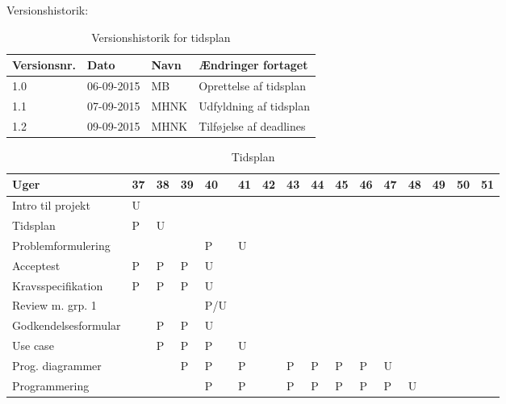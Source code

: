 \documentclass[landscape, 12pt, letterpaper]{article}
\begin{document}
\begin{table}[]
Versionshistorik:
\centering
\caption{Versionshistorik for tidsplan}
\label{my-label}
\begin{tabular}{|l|l|l|l|}
\hline
Versionsnr. & Dato       & Navn & Ændringer fortaget     \\ \hline
1.0         & 06-09-2015 & MB   & Oprettelse af tidsplan \\ \hline
1.1         & 07-09-2015 & MHNK & Udfyldning af tidsplan \\ \hline
1.2         & 09-09-2015 & MHNK & Tilføjelse af deadlines\\ \hline
\end{tabular}
\end{table}


\begin{table}[]
\centering
\caption{Tidsplan}
\label{my-label}
\begin{tabular}{|l|l|l|l|l|l|l|l|l|l|l|l|l|l|l|l|}
\hline
Uger                    & 37 & 38 & 39 & 40 & 41 & 42 & 43 & 44 & 45 & 46 & 47 & 48 & 49 & 50 & 51 \\ \hline
Intro til projekt       & U  &    &    &    &    &    &    &    &    &    &    &    &    &    &    \\ \hline
Tidsplan                & P  & U  &    &    &    &    &    &    &    &    &    &    &    &    &    \\ \hline
Problemformulering      &    &    &    & P  & U  &    &    &    &    &    &    &    &    &    &    \\ \hline
Acceptest               & P  & P  & P  & U  &    &    &    &    &    &    &    &    &    &    &    \\ \hline
Kravsspecifikation      & P  &  P & P  &  U &    &    &    &    &    &    &    &    &    &    &    \\ \hline
Review m. grp. 1        &    &    &    & P/U &    &    &    &    &    &    &    &    &    &    &    \\ \hline
Godkendelsesformular    &    &  P & P  & U  &    &    &    &    &    &    &    &    &    &    &    \\ \hline
Use case                &    &  P & P  & P  & U  &    &    &    &    &    &    &    &    &    &    \\ \hline
Prog. diagrammer        &    &    &  P & P  & P  &    & P  & P  & P  & P  & U  &    &    &    &    \\ \hline
Programmering           &    &    &    & P  & P  &    & P  & P  & P  & P  & P  & U  &    &    &    \\ \hline

\end{tabular}
\end{table}
\end{document}
